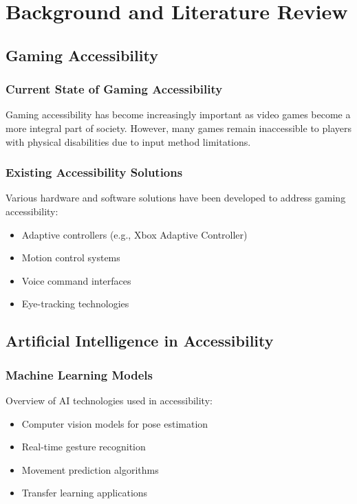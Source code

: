 \chapter{Background and Literature Review}

\section{Gaming Accessibility}
\subsection{Current State of Gaming Accessibility}
Gaming accessibility has become increasingly important as video games become a more integral part of society. However, many games remain inaccessible to players with physical disabilities due to input method limitations.

\subsection{Existing Accessibility Solutions}
Various hardware and software solutions have been developed to address gaming accessibility:
\begin{itemize}
    \item Adaptive controllers (e.g., Xbox Adaptive Controller)
    \item Motion control systems
    \item Voice command interfaces
    \item Eye-tracking technologies
\end{itemize}

\section{Artificial Intelligence in Accessibility}
\subsection{Machine Learning Models}
Overview of AI technologies used in accessibility:
\begin{itemize}
    \item Computer vision models for pose estimation
    \item Real-time gesture recognition
    \item Movement prediction algorithms
    \item Transfer learning applications
\end{itemize}

